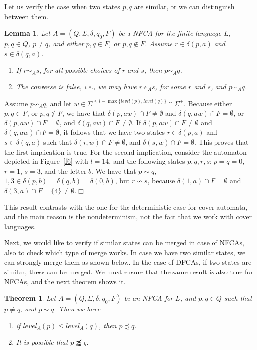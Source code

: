 \documentclass[submission,copyright,creativecommons]{eptcs}
\newtheorem{lemma}{Lemma}
\newtheorem{theorem}{Theorem}
\newenvironment{proof}[1][Proof]{\begin{trivlist}
\item[\hskip \labelsep {\bfseries #1}]}{\end{trivlist}}
\begin{document}
Let us verify the case when two states $p,q$ are similar, or we can distinguish between them.

\begin{lemma}
  Let $A=(Q,\Sigma,\delta,q_0,F)$ be  a NFCA for the finite language $L$, $p,q\in Q$, $p\neq q$,
and either $p,q\in F$, or $p,q\notin F$.
Assume $r\in \delta(p,a)$ and $s\in \delta(q,a)$.
\begin{enumerate}
 \item  If $r\sim_A s $, for all possible choices of $r$ and $s$, then $p\sim_A q$.
 \item  The converse is false, i.e., we may have  $r\not\sim_A s $, for some $r$ and $s$, and $p\sim_A q$.
\end{enumerate}
\end{lemma}
\begin{proof}
Assume  $p\not\sim_A q$, and let $w\in \Sigma^{\leq l-\max\{level(p),level(q)\}}\cap\Sigma^+$. 
Because either $p,q\in F$, or $p,q\notin F$, 
we have that $\delta(p,aw)\cap F\neq \emptyset $ and $\delta(q,aw)\cap F= \emptyset $, 
or   $\delta(p,aw)\cap F= \emptyset $, and $\delta(q,aw)\cap F\neq \emptyset $.
If $\delta(p,aw)\cap F\neq \emptyset $ and $\delta(q,aw)\cap F= \emptyset $, 
it follows that we have two states $r\in \delta(p,a)$ and $s\in \delta(q,a)$
such that  $\delta(r,w)\cap F\neq \emptyset $, and $\delta(s,w)\cap F= \emptyset $.
This proves that the first implication is true. For the second implication, 
consider the automaton depicted in Figure~\ref{f6} with $l=14$, and the following states $p,q,r,s$:
 $p=q=0$, $r=1$, $s=3$, and the letter $b$. We have that 
$p\sim q$, $1,3\in\delta(p,b)=\delta(q,b)=\delta(0,b)$, 
but $r\not\sim s$, because $\delta(1,a)\cap F=\emptyset$ 
and $\delta(3,a)\cap F=\{4\}\neq \emptyset$.$\Box$
\end{proof}

This result contrasts with the one for the deterministic case for cover automata, 
and the main reason is the nondeterminism, not the fact that we work with  cover languages.


Next, we would like to verify if similar states can be merged in case of NFCAs, also to check
 which type of merge works.
In case we have two similar states, we can strongly merge them as shown below.
In the case of DFCAs, if two states are similar, these can be merged. We must ensure that 
the same result is also true for  NFCAs, and the next theorem 
shows it. 


\begin{theorem}
\label{ltech1}
 Let $A=(Q,\Sigma,\delta,q_0,F)$ be an NFCA for $L$,
and $p,q\in Q$ such that $p\neq q$,  and $p\sim q$.
Then we have
\begin{enumerate}
 \item if $level_A(p)\leq level_A(q)$, then $p\precsim q$.
 \item It is possible that $p\not\precapprox q$.
\end{enumerate}
\end{theorem}
\end{document}
